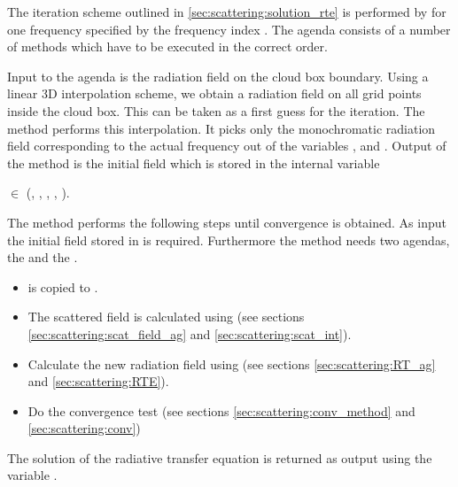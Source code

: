 \label{sec:scattering:scat_mono_ag}

The iteration scheme outlined in \ref{sec:scattering:solution_rte} is
performed by  for one frequency specified
by the frequency index . 
The agenda consists of a number of methods which have to be executed in
the correct order.


Input to the agenda is the radiation field on the cloud
box boundary.
Using a linear 3D interpolation scheme, we obtain a
radiation field on all grid points inside the cloud box.
This can be taken as a first guess for the iteration. The method
 performs this
interpolation. It picks only the monochromatic radiation field
corresponding to the actual frequency out of the variables
,  and
. Output of the method is the initial field 
which is stored in the internal variable
\begin{center}
   $\in$ (\Prs, \Lat, \Lon, \ScaZa,
\ScaAa). 
\end{center}


The method  performs the following steps 
until convergence is obtained. As input the initial field stored in
 is required. Furthermore the method needs two
agendas, the  and the
.

\begin{itemize}
\item {} is copied to .
\item The scattered field is calculated using
    (see sections \ref{sec:scattering:scat_field_ag} and
    \ref{sec:scattering:scat_int}).
\item Calculate the new radiation field using
 (see sections \ref{sec:scattering:RT_ag} and
  \ref{sec:scattering:RTE}).
\item Do the convergence test (see sections
  \ref{sec:scattering:conv_method} and \ref{sec:scattering:conv})
\end{itemize}
The solution of the radiative transfer equation is returned as output
using the variable . 

